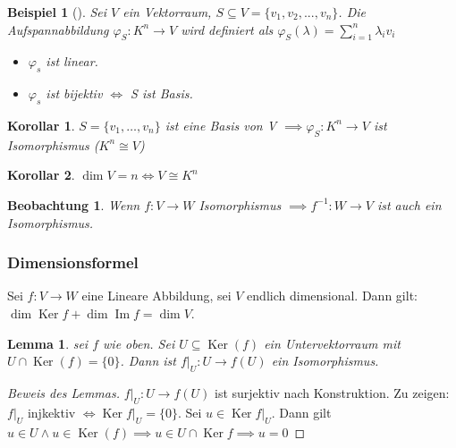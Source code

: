\documentclass[11pt]{article}
\DeclareMathOperator{\mdim}{dim}
\DeclareMathOperator{\mKer}{Ker}
\DeclareMathOperator{\mIm}{Im}
\newtheorem{exa}{Beispiel}[section]
\newtheorem{beobachtung}{Beobachtung}
\newtheorem*{lemma}{Lemma}
\newtheorem*{korollar}{Korollar}
\begin{document}
\begin{exa}[] \label{}
Sei \(V\) ein Vektorraum, \(S\subseteq V = \{v_1, v_2, ..., v_n\}\). Die
Aufspannabbildung $\varphi_S: K^n \rightarrow V$ wird definiert als $\varphi_S(\lambda)=\sum_{i=1}^{n}\lambda_i v_i$

\begin{itemize}
	\item \(\varphi_s\) ist linear.
	\item \(\varphi_s\) ist bijektiv \(\iff\) S ist Basis.
\end{itemize}
\end{exa}

\begin{korollar}
	\(S=\{v_1,\ldots,v_n\}\) ist eine Basis von V $\implies \varphi_S: K^n \rightarrow V$ ist Isomorphismus ($K^n\cong V$)
\end{korollar}

\begin{korollar}
	\(\dim V = n \iff V\cong K^n\)
\end{korollar}

\begin{beobachtung}
	Wenn \(f:V\rightarrow W\) Isomorphismus $\implies f^{-1}:W\rightarrow V $ ist auch ein Isomorphismus.
\end{beobachtung}

\subsubsection{Dimensionsformel}
\label{sec:org9a58004}
\begin{theo}{}{}
Sei \(f:V\to W\) eine Lineare Abbildung, sei \(V\) endlich dimensional. Dann gilt: \(\mdim\mKer f + \mdim\mIm f = \mdim V\).
\end{theo}

\begin{lemma} sei \(f\) wie oben. Sei \(U \subseteq \mKer(f)\) ein Untervektorraum mit \(U \cap \mKer(f) = \{0\}\).  Dann ist \(f|_U:U\to f(U)\) ein Isomorphismus.
\end{lemma}

\begin{proof}[Beweis des Lemmas] \label{}
\(f|_U:U\to f(U)\) ist surjektiv nach Konstruktion. Zu zeigen: \(f|_U\) injkektiv \(\iff \mKer f|_U = \{0\}\). Sei \(u\in \mKer f|_U \). Dann gilt \(u\in U \land u \in \mKer(f) \implies u \in U \cap \mKer f \implies u = 0\)
\end{proof}
\end{document}
